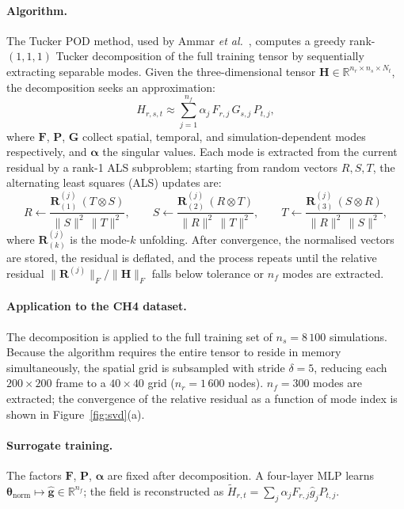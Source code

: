 \documentclass[a4paper]{article}
\newcommand{\vtheta}{\bm{\theta}}
\newcommand{\R}{\mathbb{R}}
\begin{document}
\paragraph{Algorithm.}
The Tucker POD method, used by Ammar \emph{et al.}~\cite{ammar2024hybrid}, computes a greedy rank-$(1,1,1)$ Tucker decomposition \cite{kolda2009tensor} of the full training tensor by sequentially extracting separable modes. Given the three-dimensional tensor $\bm{H} \in \R^{n_r \times n_s \times N_t}$, the decomposition seeks an approximation:
\begin{equation}
    H_{r,s,t} \approx \sum_{j=1}^{n_f} \alpha_j\, F_{r,j}\, G_{s,j}\, P_{t,j},
    \label{eq:tucker}
\end{equation}
where $\bm{F}$, $\bm{P}$, $\bm{G}$ collect spatial, temporal, and simulation-dependent modes respectively, and $\bm{\alpha}$ the singular values. Each mode is extracted from the current residual by a rank-1 ALS subproblem; starting from random vectors $R, S, T$, the alternating least squares (ALS) updates are:
\begin{equation}
    R \leftarrow \frac{\bm{R}^{(j)}_{(1)}\,(T \otimes S)}{\|S\|^2\,\|T\|^2},
    \qquad
    S \leftarrow \frac{\bm{R}^{(j)}_{(2)}\,(R \otimes T)}{\|R\|^2\,\|T\|^2},
    \qquad
    T \leftarrow \frac{\bm{R}^{(j)}_{(3)}\,(S \otimes R)}{\|R\|^2\,\|S\|^2},
    \label{eq:als}
\end{equation}
where $\bm{R}^{(j)}_{(k)}$ is the mode-$k$ unfolding. After convergence, the normalised vectors are stored, the residual is deflated, and the process repeats until the relative residual $\|\bm{R}^{(j)}\|_F / \|\bm{H}\|_F$ falls below tolerance or $n_f$ modes are extracted.

\paragraph{Application to the CH4 dataset.}
The decomposition is applied to the full training set of $n_s = 8\,100$ simulations. Because the algorithm requires the entire tensor to reside in memory simultaneously, the spatial grid is subsampled with stride $\delta = 5$, reducing each $200 \times 200$ frame to a $40 \times 40$ grid ($n_r = 1\,600$ nodes). $n_f = 300$ modes are extracted; the convergence of the relative residual as a function of mode index is shown in Figure~\ref{fig:svd}(a).

\paragraph{Surrogate training.}
The factors $\bm{F}$, $\bm{P}$, $\bm{\alpha}$ are fixed after decomposition. A four-layer MLP learns $\vtheta_{\mathrm{norm}} \mapsto \hat{\bm{g}} \in \R^{n_f}$; the field is reconstructed as $\tilde{H}_{r,t} = \sum_{j} \alpha_j F_{r,j} \hat{g}_j P_{t,j}$.
\end{document}
